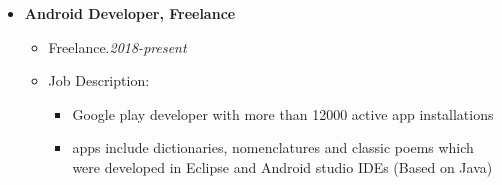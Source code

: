 \begin {itemize}
\begin {itemize}
\begin {itemize}
                \item [-]   {   Job Description:} 
                    \begin {itemize}
                        \item [\textbullet]  Closely supervising and mentoring two PhD students and coordinating their research.
                        \item [\textbullet]  Identification of funding opportunities and writing of funding applications. 
                    \end {itemize}
            \end {itemize} \vspace{0.3cm}         
     \item [$\bullet$] \bf {\mtf \normalsize   Android Developer, Freelance} \mdseries
            \begin {itemize}
                \item [-]  {  Freelance.\small \hspace{9.2cm}\textit{2018-present}\normalsize} 
                \item [-]   {   Job Description:} 
                    \begin {itemize}
                        \item [\textbullet]  Google play developer with more than 12000 active app installations
                        \item [\textbullet]  apps include dictionaries, nomenclatures and classic poems which were developed in Eclipse and Android studio IDEs (Based on Java)
                    \end {itemize}
            \end {itemize} \vspace{0.3cm}    
    \end {itemize}
\end {itemize}

